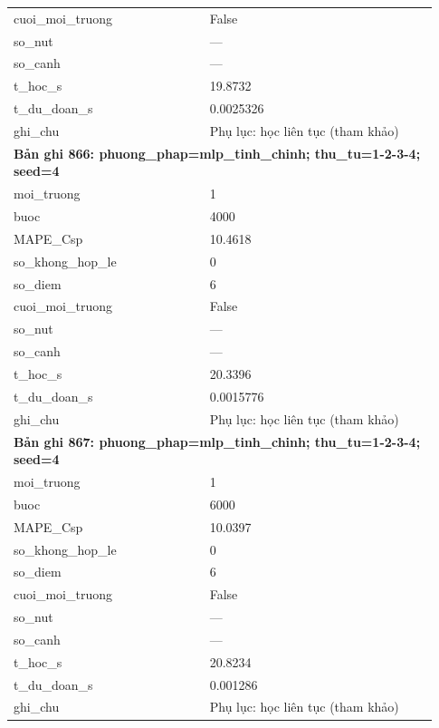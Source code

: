 \begin{longtable}{p{0.43\linewidth}p{0.50\linewidth}}
cuoi\_\allowbreak moi\_\allowbreak truong & False \\
so\_\allowbreak nut & — \\
so\_\allowbreak canh & — \\
t\_\allowbreak hoc\_\allowbreak s & 19.8732 \\
t\_\allowbreak du\_\allowbreak doan\_\allowbreak s & 0.0025326 \\
ghi\_\allowbreak chu & Phụ lục: học liên tục (tham khảo) \\
\midrule
\multicolumn{2}{p{0.95\linewidth}}{\textbf{Bản ghi 866: phuong\_phap=mlp\_tinh\_chinh; thu\_tu=1-2-3-4; seed=4}} \\
moi\_\allowbreak truong & 1 \\
buoc & 4000 \\
MAPE\_\allowbreak Csp & 10.4618 \\
so\_\allowbreak khong\_\allowbreak hop\_\allowbreak le & 0 \\
so\_\allowbreak diem & 6 \\
cuoi\_\allowbreak moi\_\allowbreak truong & False \\
so\_\allowbreak nut & — \\
so\_\allowbreak canh & — \\
t\_\allowbreak hoc\_\allowbreak s & 20.3396 \\
t\_\allowbreak du\_\allowbreak doan\_\allowbreak s & 0.0015776 \\
ghi\_\allowbreak chu & Phụ lục: học liên tục (tham khảo) \\
\midrule
\multicolumn{2}{p{0.95\linewidth}}{\textbf{Bản ghi 867: phuong\_phap=mlp\_tinh\_chinh; thu\_tu=1-2-3-4; seed=4}} \\
moi\_\allowbreak truong & 1 \\
buoc & 6000 \\
MAPE\_\allowbreak Csp & 10.0397 \\
so\_\allowbreak khong\_\allowbreak hop\_\allowbreak le & 0 \\
so\_\allowbreak diem & 6 \\
cuoi\_\allowbreak moi\_\allowbreak truong & False \\
so\_\allowbreak nut & — \\
so\_\allowbreak canh & — \\
t\_\allowbreak hoc\_\allowbreak s & 20.8234 \\
t\_\allowbreak du\_\allowbreak doan\_\allowbreak s & 0.001286 \\
ghi\_\allowbreak chu & Phụ lục: học liên tục (tham khảo) \\

\end{longtable}
